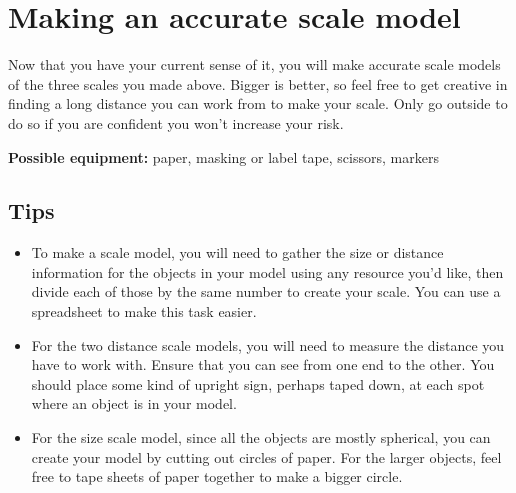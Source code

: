 \section{Making an accurate scale model}\label{se:sec:model}

Now that you have your current sense of it, you will make accurate scale models of the three scales you made above. Bigger is better, so 
feel free to get creative in finding a long distance you can work from to make your scale. Only go outside to do so if you are confident you won't increase your risk.

\textbf{Possible equipment:} paper, masking or label tape, scissors, markers


\subsection{Tips}
\begin{itemize}
	\item To make a scale model, you will need to gather the size or distance information for the objects in your model using any resource you'd like, then divide each of those by the same number to create your scale. You can use a spreadsheet to make this task easier.
	
	\item For the two distance scale models, you will need to measure the distance you have to work with.%
	Ensure that you can see from one end to the other.
	You should place some kind of upright sign, perhaps taped down, at each spot where an object is in your model.
	
	\item For the size scale model, since all the objects are mostly spherical, you can create your model by cutting out circles of paper. For the larger objects, feel free to tape sheets of paper together to make a bigger circle.
\end{itemize}

